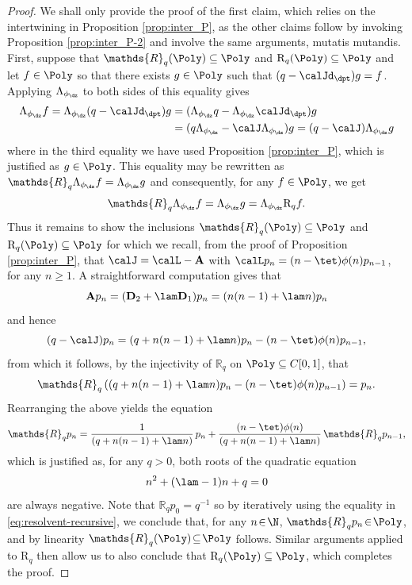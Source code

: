 \begin{proof}
We shall only provide the proof of the first claim, which relies on the intertwining in Proposition \ref{prop:inter_P}, as the other claims follow by invoking Proposition \ref{prop:inter_P-2} and involve the same arguments, mutatis mutandis. First, suppose that $\mathds{R}_q(\Poly) \subseteq \Poly$ and $\mathrm{R}_q(\Poly) \subseteq \Poly$ and let $f \in \Poly$ so that there exists $g \in \Poly$ such that $(q-\calJd_{\dpt})g = f$. Applying $\Lambda_{\phi_{\dz}}$ to both sides of this equality gives
\begin{align*}
\Lambda_{\phi_{\dz}} f = \Lambda_{\phi_{\dz}}(q-\calJd_{\dpt})g &= (\Lambda_{\phi_{\dz}} q - \Lambda_{\phi_{\dz}}\calJd_{\dpt})g\\
&= (q\Lambda_{\phi_{\dz}} - \calJ \Lambda_{\phi_{\dz}})g = (q-\calJ)\Lambda_{\phi_{\dz}} g
\end{align*}
where in the third equality we have used Proposition \ref{prop:inter_P}, which is justified as $g \in \Poly$. This equality may be rewritten as $\mathds{R}_q \Lambda_{\phi_{\dz}} f = \Lambda_{\phi_{\dz}} g$ and consequently, for any $f \in \Poly$, we get
\begin{equation*}
\mathds{R}_q \Lambda_{\phi_{\dz}} f = \Lambda_{\phi_{\dz}} g = \Lambda_{\phi_{\dz}} \mathrm{R}_q f.
\end{equation*}
Thus it remains to show the inclusions $\mathds{R}_q(\Poly) \subseteq \Poly$ and $\mathrm{R}_q(\Poly) \subseteq \Poly$ for which we recall, from the proof of Proposition \ref{prop:inter_P}, that $\calJ = \calL-\mathbf{A}$ with $\calL p_n = (n-\tet)\phi(n)p_{n-1}$, for any $n \geq 1$. A straightforward computation gives that
\[
\mathbf{A} p_n = (\mathbf{D}_2 + \lam \mathbf{D}_1)p_n = (n(n-1)+\lam n)p_n
\]
and hence
\begin{equation*}
(q-\calJ)p_n = (q+n(n-1)+\lam n)p_n-(n-\tet)\phi(n)p_{n-1},
\end{equation*}
from which it follows, by the injectivity of $\mathds{R}_q$ on $\Poly \subseteq C[0,1]$, that
\begin{equation*}
\mathds{R}_q\left((q+n(n-1)+\lam n)p_n-(n-\tet)\phi(n)p_{n-1}\right) = p_n.
\end{equation*}
Rearranging the above yields the equation
\begin{equation}
\label{eq:resolvent-recursive}
\mathds{R}_q p_n = \frac{1}{(q+n(n-1)+\lam n)}\, p_n + \frac{(n-\tet)\phi(n)}{(q+n(n-1)+\lam n)}\, \mathds{R}_q p_{n-1},
\end{equation}
which is justified as, for any $q > 0$, both roots of the quadratic equation
\[
n^2+(\lam-1)n+q = 0
\]
are always negative. Note that $\mathds{R}_q p_0 = q^{-1}$ so by iteratively using the equality in \eqref{eq:resolvent-recursive}, we conclude that, for any $n\!\in\!\N$, $\mathds{R}_q p_n\!\in\!\Poly$, and by linearity $\mathds{R}_q(\Poly)\!\subseteq\!\Poly$ follows. Similar arguments applied to $\mathrm{R}_q$ then allow us to also conclude that $\mathrm{R}_q(\Poly) \subseteq \Poly$, which completes the proof.
\end{proof}

